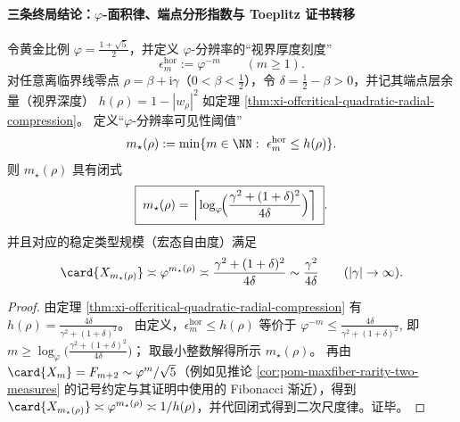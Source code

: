 \paragraph{三条终局结论：\texorpdfstring{$\varphi$}{phi}-面积律、端点分形指数与 Toeplitz 证书转移}
\begin{theorem}\label{thm:xi-bulk-horizon-phi-area-law}
令黄金比例 \(\varphi=\frac{1+\sqrt5}{2}\)，并定义 \(\varphi\)-分辨率的“视界厚度刻度”
\[
\epsilon_m^{\mathrm{hor}}:=\varphi^{-m}\qquad(m\ge 1).
\]
对任意离临界线零点 \(\rho=\beta+\mathrm{i}\gamma\)（\(0<\beta<\tfrac12\)），令 \(\delta=\tfrac12-\beta>0\)，并记其端点层余量（视界深度）
\(
h(\rho)=1-|w_\rho|^2
\)
如定理 \ref{thm:xi-offcritical-quadratic-radial-compression}。
定义“\(\varphi\)-分辨率可见性阈值”
\[
m_\star(\rho):=\min\{m\in\NN:\ \epsilon_m^{\mathrm{hor}}\le h(\rho)\}.
\]
则 \(m_\star(\rho)\) 具有闭式
\[
\boxed{\;
m_\star(\rho)=\left\lceil \log_{\varphi}\!\Bigl(\frac{\gamma^2+(1+\delta)^2}{4\delta}\Bigr)\right\rceil\; }.
\]
并且对应的稳定类型规模（宏态自由度）满足
\[
\card{X_{m_\star(\rho)}}\asymp \varphi^{m_\star(\rho)}
\asymp \frac{\gamma^2+(1+\delta)^2}{4\delta}
\sim \frac{\gamma^2}{4\delta}\qquad(|\gamma|\to\infty).
\]
\end{theorem}
\begin{proof}
由定理 \ref{thm:xi-offcritical-quadratic-radial-compression} 有
\(
h(\rho)=\frac{4\delta}{\gamma^2+(1+\delta)^2}
\)。
由定义，\(\epsilon_m^{\mathrm{hor}}\le h(\rho)\) 等价于
\(
\varphi^{-m}\le \frac{4\delta}{\gamma^2+(1+\delta)^2}
\),
即
\(
m\ge \log_{\varphi}\!\bigl(\frac{\gamma^2+(1+\delta)^2}{4\delta}\bigr)
\)；
取最小整数解得所示 \(m_\star(\rho)\)。
再由 \(\card{X_m}=F_{m+2}\sim \varphi^m/\sqrt5\)（例如见推论 \ref{cor:pom-maxfiber-rarity-two-measures} 的记号约定与其证明中使用的 Fibonacci 渐近），得到
\(\card{X_{m_\star(\rho)}}\asymp \varphi^{m_\star(\rho)}\asymp 1/h(\rho)\)，并代回闭式得到二次尺度律。证毕。
\end{proof}

